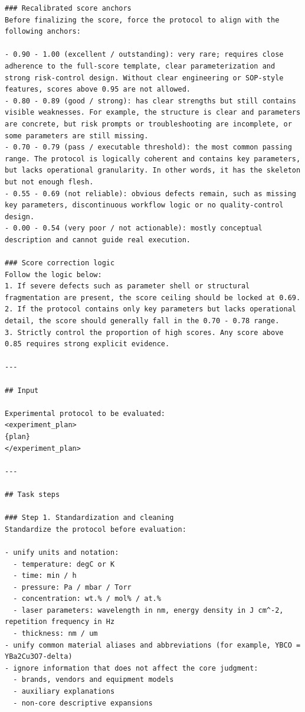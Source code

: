 \begin{lstlisting}[style=jsonstyle]
### Recalibrated score anchors
Before finalizing the score, force the protocol to align with the following anchors:

- 0.90 - 1.00 (excellent / outstanding): very rare; requires close adherence to the full-score template, clear parameterization and strong risk-control design. Without clear engineering or SOP-style features, scores above 0.95 are not allowed.
- 0.80 - 0.89 (good / strong): has clear strengths but still contains visible weaknesses. For example, the structure is clear and parameters are concrete, but risk prompts or troubleshooting are incomplete, or some parameters are still missing.
- 0.70 - 0.79 (pass / executable threshold): the most common passing range. The protocol is logically coherent and contains key parameters, but lacks operational granularity. In other words, it has the skeleton but not enough flesh.
- 0.55 - 0.69 (not reliable): obvious defects remain, such as missing key parameters, discontinuous workflow logic or no quality-control design.
- 0.00 - 0.54 (very poor / not actionable): mostly conceptual description and cannot guide real execution.

### Score correction logic
Follow the logic below:
1. If severe defects such as parameter shell or structural fragmentation are present, the score ceiling should be locked at 0.69.
2. If the protocol contains only key parameters but lacks operational detail, the score should generally fall in the 0.70 - 0.78 range.
3. Strictly control the proportion of high scores. Any score above 0.85 requires strong explicit evidence.

---

## Input

Experimental protocol to be evaluated:
<experiment_plan>
{plan}
</experiment_plan>

---

## Task steps

### Step 1. Standardization and cleaning
Standardize the protocol before evaluation:

- unify units and notation:
  - temperature: degC or K
  - time: min / h
  - pressure: Pa / mbar / Torr
  - concentration: wt.% / mol% / at.%
  - laser parameters: wavelength in nm, energy density in J cm^-2, repetition frequency in Hz
  - thickness: nm / um
- unify common material aliases and abbreviations (for example, YBCO = YBa2Cu3O7-delta)
- ignore information that does not affect the core judgment:
  - brands, vendors and equipment models
  - auxiliary explanations
  - non-core descriptive expansions


\end{lstlisting}
